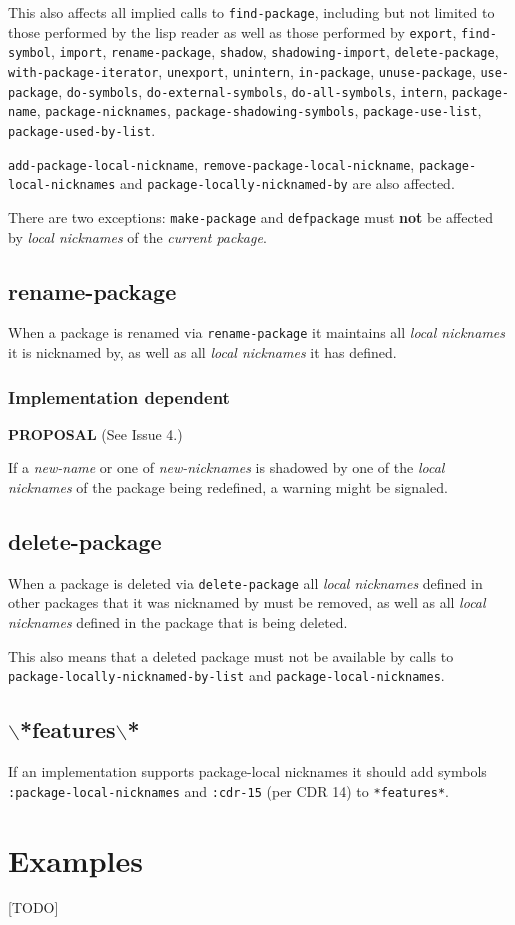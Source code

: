 \documentclass[11pt]{article}
\begin{document}
This also affects all implied calls to \texttt{find-package}, including but not
limited to those performed by the lisp reader as well as those performed
by \texttt{export}, \texttt{find-symbol}, \texttt{import}, \texttt{rename-package}, \texttt{shadow},
\texttt{shadowing-import}, \texttt{delete-package}, \texttt{with-package-iterator}, \texttt{unexport},
\texttt{unintern}, \texttt{in-package}, \texttt{unuse-package}, \texttt{use-package}, \texttt{do-symbols},
\texttt{do-external-symbols}, \texttt{do-all-symbols}, \texttt{intern}, \texttt{package-name},
\texttt{package-nicknames}, \texttt{package-shadowing-symbols}, \texttt{package-use-list},
\texttt{package-used-by-list}.

\texttt{add-package-local-nickname}, \texttt{remove-package-local-nickname},
\texttt{package-local-nicknames} and \texttt{package-locally-nicknamed-by} are also
affected.

There are two exceptions: \texttt{make-package} and \texttt{defpackage} must \textbf{not} be
affected by \emph{local nicknames} of the \emph{current package}.
\subsection{rename-package}
\label{sec:org6c442c4}
When a package is renamed via \texttt{rename-package} it maintains all \emph{local
nicknames} it is nicknamed by, as well as all \emph{local nicknames} it has
defined.
\subsubsection{Implementation dependent}
\label{sec:org7d842a0}
\textbf{PROPOSAL} (See Issue 4.)

If a \emph{new-name} or one of \emph{new-nicknames} is shadowed by one of the \emph{local
nicknames} of the package being redefined, a warning might be signaled.
\subsection{delete-package}
\label{sec:org7a57668}
When a package is deleted via \texttt{delete-package} all \emph{local nicknames}
defined in other packages that it was nicknamed by must be removed, as well
as all \emph{local nicknames} defined in the package that is being deleted.

This also means that a deleted package must not be available by calls to
\texttt{package-locally-nicknamed-by-list} and \texttt{package-local-nicknames}.
\subsection{$\backslash$*features$\backslash$*}
\label{sec:org5710d28}
If an implementation supports package-local nicknames it should add symbols
\texttt{:package-local-nicknames} and \texttt{:cdr-15} (per CDR 14) to \texttt{*features*}.
\section{Examples}
\label{sec:org830afc7}
[TODO]
\end{document}

